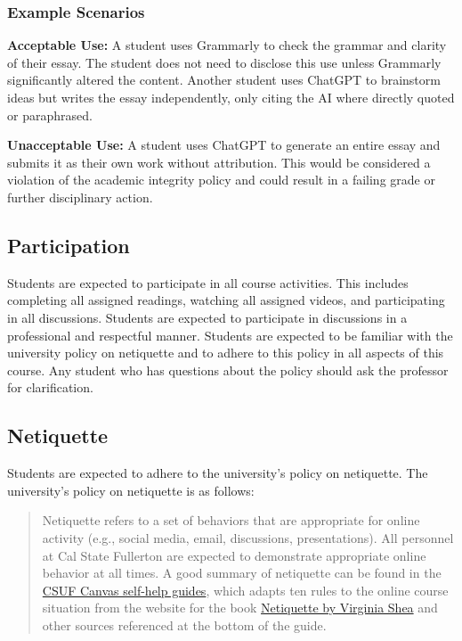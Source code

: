 \documentclass[11pt, letterpaper]{article}
\begin{document}
\subsubsection*{Example Scenarios}
\textbf{Acceptable Use:} A student uses Grammarly to check the grammar and clarity of their essay. The student does not need to disclose this use unless Grammarly significantly altered the content. Another student uses ChatGPT to brainstorm ideas but writes the essay independently, only citing the AI where directly quoted or paraphrased.

\vspace{1ex}

\noindent\textbf{Unacceptable Use:} A student uses ChatGPT to generate an entire essay and submits it as their own work without attribution. This would be considered a violation of the academic integrity policy and could result in a failing grade or further disciplinary action.

\subsection*{Participation}

Students are expected to participate in all course activities. This includes completing all assigned readings, watching all assigned videos, and participating in all discussions. Students are expected to participate in discussions in a professional and respectful manner. Students are expected to be familiar with the university policy on netiquette and to adhere to this policy in all aspects of this course. Any student who has questions about the policy should ask the professor for clarification. 

\subsection*{Netiquette}
Students are expected to adhere to the university's policy on netiquette. The university's policy on netiquette is as follows:
\begin{quote}Netiquette refers to a set of behaviors that are appropriate for online activity (e.g., social media, email, discussions, presentations). All personnel at Cal State Fullerton are expected to demonstrate appropriate online behavior at all times. A good summary of netiquette can be found in the \href{https://canvashelp.fullerton.edu/m/Student/l/1336786-student-what-is-netiquette}{CSUF Canvas self-help guides}, which adapts ten rules to the online course situation from the website for the book \href{http://www.albion.com/netiquette/corerules.html}{Netiquette by Virginia Shea} and other sources referenced at the bottom of the guide.\end{quote}
\end{document}
